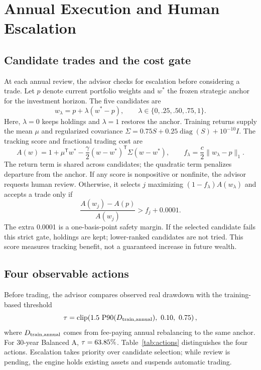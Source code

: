 \section{Annual Execution and Human Escalation}
\subsection{Candidate trades and the cost gate}
At each annual review, the advisor checks for escalation before considering a trade. Let $p$ denote current portfolio weights and $w^*$ the frozen strategic anchor for the investment horizon. The five candidates are
\begin{equation}
w_\lambda=p+\lambda(w^*-p),\qquad
\lambda\in\{0,.25,.50,.75,1\}.
\end{equation}
Here, $\lambda=0$ keeps holdings and $\lambda=1$ restores the anchor. Training returns supply the mean $\mu$ and regularized covariance $\Sigma=0.75S+0.25\operatorname{diag}(S)+10^{-10}I$. The tracking score and fractional trading cost are
\begin{equation}
A(w)=1+\mu^{\mathsf T}w^*-\frac{\gamma}{2}(w-w^*)^{\mathsf T}\Sigma(w-w^*),
\qquad f_\lambda=\frac{c}{2}\lVert w_\lambda-p\rVert_1.
\end{equation}
The return term is shared across candidates; the quadratic term penalizes departure from the anchor. If any score is nonpositive or nonfinite, the advisor requests human review. Otherwise, it selects $j$ maximizing $(1-f_\lambda)A(w_\lambda)$ and accepts a trade only if
\begin{equation}
\frac{A(w_j)-A(p)}{A(w_j)}>f_j+0.0001.
\label{eq:gate}
\end{equation}
The extra 0.0001 is a one-basis-point safety margin. If the selected candidate fails this strict gate, holdings are kept; lower-ranked candidates are not tried. This score measures tracking benefit, not a guaranteed increase in future wealth.

\subsection{Four observable actions}
Before trading, the advisor compares observed real drawdown with the training-based threshold
\begin{equation}
\tau=\operatorname{clip}\!\left(1.5\,\operatorname{P90}(D_{\rm train,annual}),\ 0.10,\ 0.75\right),
\end{equation}
where $D_{\rm train,annual}$ comes from fee-paying annual rebalancing to the same anchor. For 30-year Balanced A, $\tau=63.85\%$. Table~\ref{tab:actions} distinguishes the four actions. Escalation takes priority over candidate selection; while review is pending, the engine holds existing assets and suspends automatic trading.

